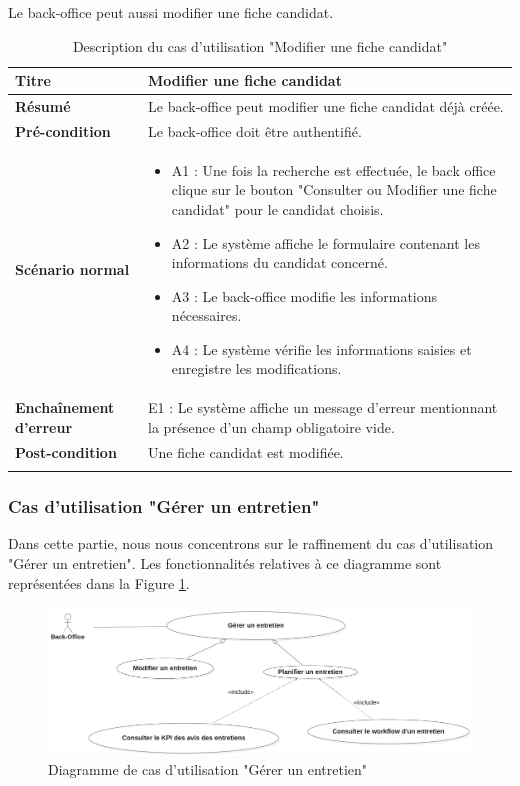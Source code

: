 \newpage
Le back-office peut aussi modifier une fiche candidat.
\begin{longtable}[c]{
    |p{}|
    |p{}|
}
    \hline
    \textbf{Titre}
    &    Modifier une fiche candidat\\
    \hline
    \textbf{Résumé}
    & Le back-office peut modifier une fiche candidat déjà créée. \\
    \hline
     \textbf{Pré-condition}
    & Le back-office doit être authentifié.\\
    \hline
     \textbf{Scénario normal}
    & \begin{itemize}
        \item A1 : Une fois la recherche est effectuée, le back office clique sur le bouton "Consulter ou Modifier une fiche candidat" pour le candidat choisis. 
        \item A2 : Le système affiche le formulaire contenant les informations du candidat concerné.
        \item A3 : Le back-office modifie les informations nécessaires.
        \item A4 : Le système vérifie les informations saisies et enregistre les modifications.
    \end{itemize}\\
    \hline
    \textbf{Enchaînement d'erreur}
    & E1 : Le système affiche un message d'erreur mentionnant la présence d'un champ obligatoire vide.\\
    \hline
    \textbf{Post-condition}
    & Une fiche candidat est modifiée.\\
    \hline
\caption{Description du cas d'utilisation "Modifier une fiche candidat"}
\label{tab:desc_modif_fiche}
\end{longtable} 
\subsubsection{Cas d'utilisation "Gérer un entretien"}
Dans cette partie, nous nous concentrons sur le raffinement du cas d'utilisation "Gérer un entretien". Les fonctionnalités relatives à ce diagramme sont représentées dans la Figure \ref{fig:gerer_entretien}.

\begin{figure}[H]
     \centering
     \includegraphics[scale=0.35]{img/raffinement gerer entretien.png}
     \caption{Diagramme de cas d'utilisation "Gérer un entretien"}
     \label{fig:gerer_entretien}
 \end{figure}

